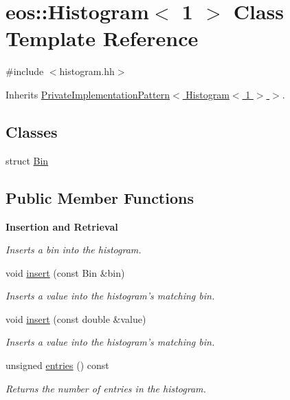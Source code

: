 \hypertarget{classeos_1_1Histogram_3_011_01_4}{
\section{eos::Histogram$<$ 1 $>$ Class Template Reference}
\label{classeos_1_1Histogram_3_011_01_4}
}


{\ttfamily \#include $<$histogram.hh$>$}

Inherits \hyperlink{classeos_1_1PrivateImplementationPattern}{PrivateImplementationPattern$<$ Histogram$<$ 1 $>$ $>$}.\subsection*{Classes}
\begin{DoxyCompactItemize}
\item 
struct \hyperlink{structeos_1_1Histogram_3_011_01_4_1_1Bin}{Bin}
\end{DoxyCompactItemize}
\subsection*{Public Member Functions}
\begin{Indent}{\bf Insertion and Retrieval}\par
{\em \label{_amgrp1fa92f5fa236ed95d2fd750c3379ff61}
 Inserts a bin into the histogram. }\begin{DoxyCompactItemize}
\item 
void \hyperlink{classeos_1_1Histogram_3_011_01_4_ab36f9b8a8fa6af4cf9df82140c79a1ff}{insert} (const Bin \&bin)
\begin{DoxyCompactList}\small\item\em Inserts a value into the histogram's matching bin. \item\end{DoxyCompactList}\item 
void \hyperlink{classeos_1_1Histogram_3_011_01_4_a640dfd992be8cc9d16b8635a739ffaad}{insert} (const double \&value)
\begin{DoxyCompactList}\small\item\em Inserts a value into the histogram's matching bin. \item\end{DoxyCompactList}\item 
unsigned \hyperlink{classeos_1_1Histogram_3_011_01_4_aa3aebb76fd88285eb49739901a5f9174}{entries} () const 
\begin{DoxyCompactList}\small\item\em Returns the number of entries in the histogram. \item\end{DoxyCompactList}\end{DoxyCompactItemize}
\end{Indent}
